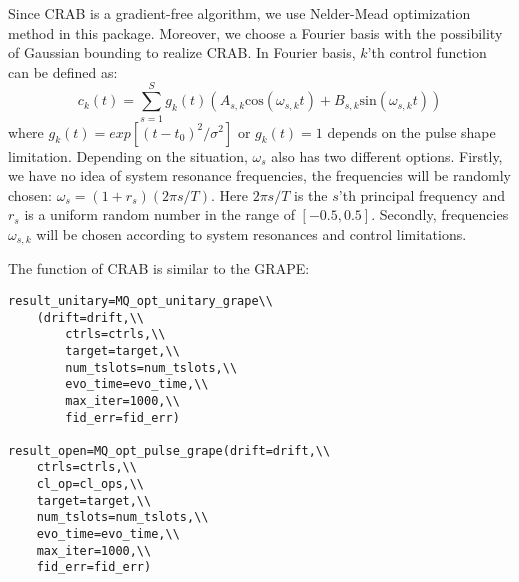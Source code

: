Since CRAB is a gradient-free algorithm, we use Nelder-Mead optimization method in this package. Moreover, we choose a Fourier basis with the possibility of Gaussian bounding to realize CRAB. In Fourier basis, $k$'th control function can be defined as:
\begin{equation}
    c_{k}(t)=\sum_{s=1}^{S}g_{k}(t)(A_{s,k}\mathrm{cos}(\omega_{s,k}t)+B_{s,k}\mathrm{sin}(\omega_{s,k}t))
\end{equation}
where $g_{k}(t)=exp\left[(t-t_{0})^{2}/\sigma^{2}\right]$ or $g_{k}(t)=1$ depends on the pulse shape limitation. Depending on the situation, $\omega_{s}$ also has two different options. Firstly, we have no idea of system resonance frequencies, the frequencies will be randomly chosen: $\omega_{s}=(1+r_s)(2\pi s/T)$. Here $2\pi s/T$ is the $s$'th principal frequency and $r_s$ is a uniform random number in the range of $[-0.5,0.5]$. Secondly, frequencies ${\omega_{s,k}}$ will be chosen according to system resonances and control limitations.

The function of CRAB is similar to the GRAPE:
\begin{lstlisting}
result_unitary=MQ_opt_unitary_grape\\
    (drift=drift,\\
        ctrls=ctrls,\\
        target=target,\\
        num_tslots=num_tslots,\\
        evo_time=evo_time,\\
        max_iter=1000,\\
        fid_err=fid_err)

result_open=MQ_opt_pulse_grape(drift=drift,\\
    ctrls=ctrls,\\
    cl_op=cl_ops,\\
    target=target,\\
    num_tslots=num_tslots,\\
    evo_time=evo_time,\\
    max_iter=1000,\\
    fid_err=fid_err)
\end{lstlisting}

